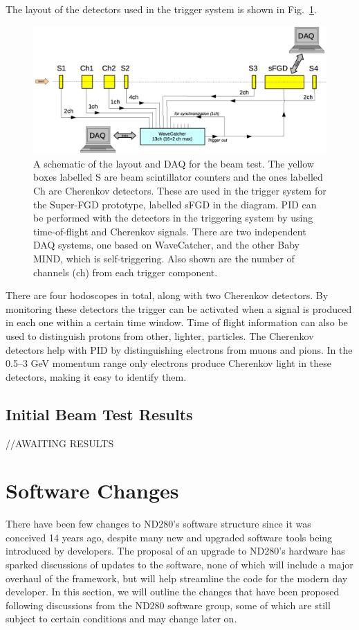 \documentclass[aps,pra,12pt,notitlepage,tightenlines]{revtex4-1}
\begin{document}
The layout of the detectors used in the trigger system is shown in Fig.\ \ref{fig:daq}.
\begin{figure}
 \includegraphics[scale=0.55]{daq}
 \caption{A schematic of the layout and DAQ for the beam test. The yellow boxes labelled S are beam scintillator counters and the ones labelled Ch are Cherenkov detectors. These are used in the trigger system for the Super-FGD prototype, labelled sFGD in the diagram. PID can be performed with the detectors in the triggering system by using time-of-flight and Cherenkov signals. There are two independent DAQ systems, one based on WaveCatcher, and the other Baby MIND, which is self-triggering. Also shown are the number of channels (ch) from each trigger component.}
 \label{fig:daq}
\end{figure}
There are four hodoscopes in total, along with two Cherenkov detectors. By monitoring these detectors the trigger can be activated when a signal is produced in each one within a certain time window. Time of flight information can also be used to distinguish protons from other, lighter, particles. The Cherenkov detectors help with PID by distinguishing electrons from muons and pions. In the 0.5--3 GeV momentum range only electrons produce Cherenkov light in these detectors, making it easy to identify them.

\subsection{Initial Beam Test Results}
//AWAITING RESULTS

\section{Software Changes}
There have been few changes to ND280's software structure since it was conceived 14 years ago, despite many new and upgraded software tools being introduced by developers. The proposal of an upgrade to ND280's hardware has sparked discussions of updates to the software, none of which will include a major overhaul of the framework, but will help streamline the code for the modern day developer. In this section, we will outline the changes that have been proposed following discussions from the ND280 software group, some of which are still subject to certain conditions and may change later on.
\end{document}

